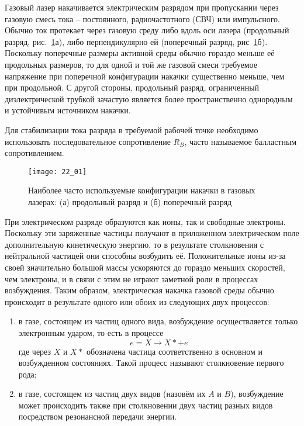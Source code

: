 
Газовый лазер накачивается электрическим разрядом при пропускании через 
газовую смесь тока -- постоянного, радиочастотного (СВЧ) или импульсного. 
Обычно ток протекает через газовую среду либо вдоль оси лазера 
(продольный разряд, рис.~\ref{img22.1}а), либо перпендикулярно ей (поперечный 
разряд, рис~\ref{img22.1}б). Поскольку поперечные размеры активной среды 
обычно гораздо меньше её продольных размеров, то для одной и той же газовой 
смеси требуемое напряжение при поперечной конфигурации накачки существенно 
меньше, чем при продольной. С другой стороны, продольный разряд, ограниченный 
диэлектрической трубкой зачастую является более пространственно однородным и 
устойчивым источником накачки. 

Для стабилизации тока разряда в требуемой рабочей точке необходимо 
использовать последовательное сопротивление \( R_B \), часто называемое 
балластным сопротивлением. 

\begin{figure}[h!]
    \center
    \texttt{[image: 22\_01]}
    \caption{Наиболее часто используемые конфигурации накачки в газовых 
    	лазерах: (а) продольный разряд и (б) поперечный разряд}
    \label{img22.1}
\end{figure}

При электрическом разряде образуются как ионы, так и свободные электроны. 
Поскольку эти заряженные частицы получают в приложенном электрическом поле 
дополнительную кинетическую энергию, то в результате столкновения с 
нейтральной частицей они способны возбудить её. Положительные ионы из-за 
своей значительно большой массы ускоряются до гораздо меньших скоростей, чем 
электроны, и в связи с этим не играют заметной роли в процессах возбуждения. 
Таким образом, электрическая накачка газовой среды обычно происходит в 
результате одного или обоих из следующих двух процессов:
\begin{enumerate}
	\item в газе, состоящем из частиц одного вида, возбуждение осуществляется 
		только электронным ударом, то есть в процессе 
		\[ e = X \rightarrow X* + e \]
		где через \( X \) и \( X* \) обозначена частица соответственно в 
		основном и возбужденном состояниях. Такой процесс называют 
		столкновение первого рода;
	\item в газе, состоящем из частиц двух видов (назовём их \( A \) и 
		\( B \)), возбуждение может происходить также при столкновении двух 
		частиц разных видов посредством резонансной передачи энергии.
\end{enumerate}

